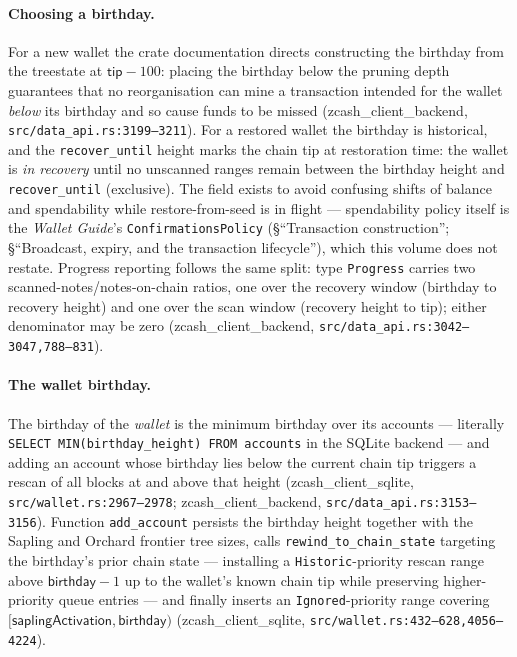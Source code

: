 \documentclass[11pt,a4paper]{article}
\theoremstyle{definition}
\begin{document}
\paragraph{Choosing a birthday.} For a new wallet the crate documentation
directs constructing the birthday from the treestate at
$\mathsf{tip} - 100$: placing the birthday below the pruning depth
guarantees that no reorganisation can mine a transaction intended for the
wallet \emph{below} its birthday and so cause funds to be missed
(\textsf{zcash\_client\_backend}, \texttt{src/data\_api.rs:3199--3211}). For a
restored wallet the birthday is historical, and the \texttt{recover\_until}
height marks the chain tip at restoration time: the wallet is \emph{in
recovery} until no unscanned ranges remain between the birthday height and
\texttt{recover\_until} (exclusive). The field exists to avoid confusing
shifts of balance and spendability while restore-from-seed is in flight ---
spendability policy itself is the \emph{Wallet Guide}'s
\texttt{ConfirmationsPolicy} (\S``Transaction construction'';
\S``Broadcast, expiry, and the transaction lifecycle''), which this volume
does not restate. Progress reporting follows the same split: type
\texttt{Progress} carries two scanned-notes/notes-on-chain ratios, one over
the recovery window (birthday to recovery height) and one over the scan
window (recovery height to tip); either denominator may be zero
(\textsf{zcash\_client\_backend},
\texttt{src/data\_api.rs:3042--3047,788--831}).

\paragraph{The wallet birthday.} The birthday of the \emph{wallet} is the
minimum birthday over its accounts --- literally
\texttt{SELECT MIN(birthday\_height) FROM accounts} in the SQLite backend
--- and adding an account whose birthday lies below the current chain tip
triggers a rescan of all blocks at and above that height
(\textsf{zcash\_client\_sqlite}, \texttt{src/wallet.rs:2967--2978};
\textsf{zcash\_client\_backend}, \texttt{src/data\_api.rs:3153--3156}). Function
\texttt{add\_account} persists the birthday height together with the
Sapling and Orchard frontier tree sizes, calls
\texttt{rewind\_to\_chain\_state} targeting the birthday's prior chain
state --- installing a \texttt{Historic}-priority rescan range above
$\mathsf{birthday} - 1$ up to the wallet's known chain tip while preserving
higher-priority queue entries --- and finally inserts an
\texttt{Ignored}-priority range covering
$[\mathsf{saplingActivation}, \mathsf{birthday})$
(\textsf{zcash\_client\_sqlite}, \texttt{src/wallet.rs:432--628,4056--4224}).
\end{document}
